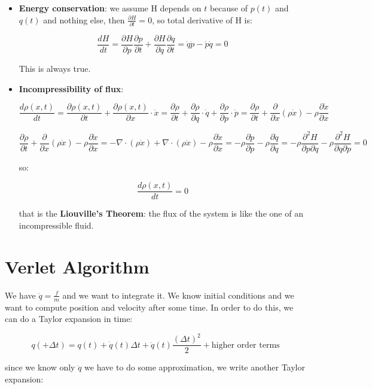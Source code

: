 \documentclass[a4paper, italian, openany]{book}
\begin{document}
\begin{itemize}
\item \textbf{Energy conservation}: we assume H depends on $t$ because of $p(t)$ and $q(t)$ and nothing else, then $\frac{\partial H}{\partial t} = 0$, so total derivative of H is:

$$\frac{dH}{dt} = \frac{\partial H}{\partial p} \frac{\partial p}{\partial t} + \frac{\partial H}{\partial q}\frac{\partial q}{\partial t} = \dot{q}\dot{p} - \dot{p}\dot{q} = 0$$

This is always true.

\item \textbf{Incompressibility of flux}:

$$\frac{d\rho (x, t)}{dt} = \frac{\partial \rho(x, t)}{\partial t} + \frac{\partial \rho(x, t)}{\partial x} \cdot \dot{x} = \frac{\partial \rho}{\partial t} + \frac{\partial \rho}{\partial q} \cdot \dot{q} + \frac{\partial \rho}{\partial p}\cdot \dot{p} = \frac{\partial \rho}{\partial t} + \frac{\partial}{\partial x} (\rho \dot{x} ) - \rho \frac{\partial \dot{x}}{\partial x}$$

$$\frac{\partial \rho}{\partial t} + \frac{\partial}{\partial x} (\rho \dot{x} ) - \rho \frac{\partial \dot{x}}{\partial x} = -\nabla \cdot (\rho \dot{x}) + \nabla \cdot (\rho \dot{x}) - \rho \frac{\partial \dot{x}}{\partial x} = -\rho\frac{\partial \dot{p}}{\partial p} - \rho \frac{\partial \dot{q}}{\partial q} = -\rho\frac{\partial^2 H}{\partial p \partial q} - \rho \frac{\partial^2 H}{\partial q \partial p} = 0$$

so:

$$\frac{d\rho (x, t)}{dt} = 0$$

that is the \textbf{Liouville's Theorem}: the flux of the system is like the one of an incompressible fluid.

\end{itemize}

\section{Verlet Algorithm}

We have $\ddot{q} = \frac{f}{m}$ and we want to integrate it. We know initial conditions and we want to compute position and velocity after some time. In order to do this, we can do a Taylor expansion in time:

$$q( +\Delta t) = q(t) + \dot{q}(t) \Delta t + \ddot{q} (t) \frac{(\Delta t)^2}{2} + \mbox{higher order terms}$$

since we know only $\ddot{q}$ we have to do some approximation, we write another Taylor expansion:
\end{document}
